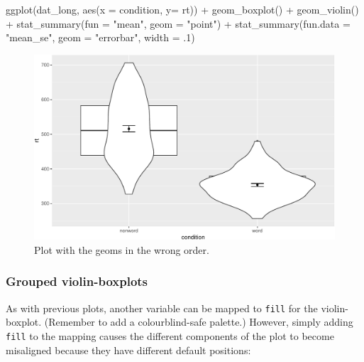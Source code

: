 \documentclass[
  english,
  doc,floatsintext]{apa6}
\newenvironment{Shaded}{\begin{snugshade}}{\end{snugshade}}
\newcommand{\AttributeTok}[1]{\textcolor[rgb]{0.77,0.63,0.00}{#1}}
\newcommand{\DecValTok}[1]{\textcolor[rgb]{0.00,0.00,0.81}{#1}}
\newcommand{\FunctionTok}[1]{\textcolor[rgb]{0.00,0.00,0.00}{#1}}
\newcommand{\NormalTok}[1]{#1}
\newcommand{\SpecialCharTok}[1]{\textcolor[rgb]{0.00,0.00,0.00}{#1}}
\newcommand{\StringTok}[1]{\textcolor[rgb]{0.31,0.60,0.02}{#1}}
\begin{document}
\begin{Shaded}
\begin{Highlighting}[]
\FunctionTok{ggplot}\NormalTok{(dat\_long, }\FunctionTok{aes}\NormalTok{(}\AttributeTok{x =}\NormalTok{ condition, }\AttributeTok{y=}\NormalTok{ rt)) }\SpecialCharTok{+}
  \FunctionTok{geom\_boxplot}\NormalTok{() }\SpecialCharTok{+}  
  \FunctionTok{geom\_violin}\NormalTok{() }\SpecialCharTok{+}
  \FunctionTok{stat\_summary}\NormalTok{(}\AttributeTok{fun =} \StringTok{"mean"}\NormalTok{,  }\AttributeTok{geom =} \StringTok{"point"}\NormalTok{) }\SpecialCharTok{+}
  \FunctionTok{stat\_summary}\NormalTok{(}\AttributeTok{fun.data =} \StringTok{"mean\_se"}\NormalTok{, }
               \AttributeTok{geom =} \StringTok{"errorbar"}\NormalTok{, }
               \AttributeTok{width =}\NormalTok{ .}\DecValTok{1}\NormalTok{)}
\end{Highlighting}
\end{Shaded}

\begin{figure}

{\centering \includegraphics[width=1\linewidth]{images/viobox1b-1} 

}

\caption{Plot with the geoms in the wrong order.}\label{fig:viobox1b}
\end{figure}

\hypertarget{grouped-violin-boxplots}{%
\subsubsection{Grouped violin-boxplots}\label{grouped-violin-boxplots}}

As with previous plots, another variable can be mapped to \texttt{fill} for the violin-boxplot. (Remember to add a colourblind-safe palette.) However, simply adding \texttt{fill} to the mapping causes the different components of the plot to become misaligned because they have different default positions:
\end{document}
